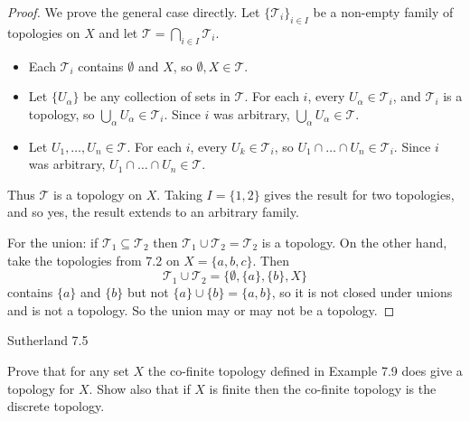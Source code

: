 \documentclass[minion]{homework}
\begin{document}
\begin{problems}
\begin{proof}
  We prove the general case directly. Let $\{\mathcal{T}_i\}_{i \in I}$ be a non-empty family of topologies on $X$ and let $\mathcal{T} = \bigcap_{i \in I} \mathcal{T}_i$.
  \begin{itemize}
    \item[(T1)] Each $\mathcal{T}_i$ contains $\emptyset$ and $X$, so $\emptyset, X \in \mathcal{T}$.
    \item[(T2)] Let $\{U_\alpha\}$ be any collection of sets in $\mathcal{T}$. For each $i$, every $U_\alpha \in \mathcal{T}_i$, and $\mathcal{T}_i$ is a topology, so $\bigcup_\alpha U_\alpha \in \mathcal{T}_i$. Since $i$ was arbitrary, $\bigcup_\alpha U_\alpha \in \mathcal{T}$.
    \item[(T3)] Let $U_1, \dots, U_n \in \mathcal{T}$. For each $i$, every $U_k \in \mathcal{T}_i$, so $U_1 \cap \dots \cap U_n \in \mathcal{T}_i$. Since $i$ was arbitrary, $U_1 \cap \dots \cap U_n \in \mathcal{T}$.
  \end{itemize}
  Thus $\mathcal{T}$ is a topology on $X$. Taking $I = \{1,2\}$ gives the result for two topologies, and so yes, the result extends to an arbitrary family.

  For the union: if $\mathcal{T}_1 \subseteq \mathcal{T}_2$ then $\mathcal{T}_1 \cup \mathcal{T}_2 = \mathcal{T}_2$ is a topology. On the other hand, take the topologies from 7.2 on $X = \{a,b,c\}$. Then
  $$\mathcal{T}_1 \cup \mathcal{T}_2 = \{\emptyset, \{a\}, \{b\}, X\}$$
  contains $\{a\}$ and $\{b\}$ but not $\{a\} \cup \{b\} = \{a,b\}$, so it is not closed under unions and is not a topology. So the union may or may not be a topology.
\end{proof}

\problem Sutherland 7.5

Prove that for any set $X$ the co-finite topology defined in Example 7.9 does give a topology for $X$. Show also that if $X$ is finite then the co-finite topology is the discrete topology.


\end{problems}
\end{document}
